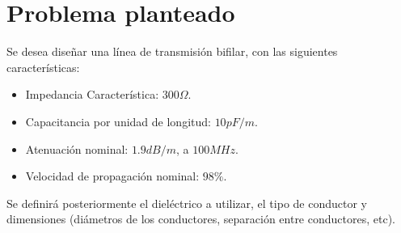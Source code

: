 \section{Problema planteado}
Se desea diseñar una línea de transmisión bifilar, con las siguientes características:

\begin{itemize}
    \item Impedancia Característica: $300 \Omega$.
    \item Capacitancia por unidad de longitud: $10 pF/m$.
    \item Atenuación nominal: $1.9 dB/m$, a $100MHz$.
    \item Velocidad de propagación nominal: $98\%$.
\end{itemize}

Se definirá posteriormente el dieléctrico a utilizar, el tipo de conductor y dimensiones (diámetros de los conductores, separación entre conductores, etc).

\pagebreak